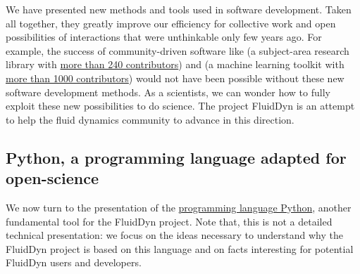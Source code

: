 
We have presented new methods and tools used in software development.  Taken
all together, they greatly improve our efficiency for collective work and open
possibilities of interactions that were unthinkable only few years ago.
%
For example, the success of community-driven software like  (a
subject-area research library with \href{https://github.com/astropy/astropy}{more
than 240 contributors}) and  (a machine learning toolkit with
\href{https://github.com/scikit-learn/scikit-learn}{more than 1000 contributors})
would not have been possible without these new software development methods.
%
%
As a scientists, we can wonder how to fully exploit these new possibilities to do
science.  The project FluidDyn is an attempt to help the fluid dynamics community
to advance in this direction.



\subsection{Python, a programming language adapted for open-science}

We now turn to the presentation of the
\href{https://www.python.org/}{programming language Python}, another
fundamental tool for the FluidDyn project.  Note that, this is not a detailed
technical presentation: we focus on the ideas necessary to understand why the
FluidDyn project is based on this language and on facts interesting for
potential FluidDyn users and developers.

